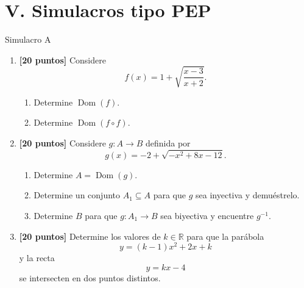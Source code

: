 \documentclass[letterpaper, 12pt]{article}
\newcommand{\R}{\mathbb{R}}
\newcommand{\Dom}{\operatorname{Dom}}
\begin{document}
\newpage
\section*{V. Simulacros tipo PEP}

\begin{pepbox}{Simulacro A}
\begin{enumerate}[label=\textbf{\arabic*.}, leftmargin=*, itemsep=1em]
    \item \textbf{[20 puntos]} Considere
    \[
        f(x)=1+\sqrt{\frac{x-3}{x+2}}.
    \]
    \begin{enumerate}[label=\textbf{\alph*)}]
        \item Determine $\Dom(f)$.
        \item Determine $\Dom(f\circ f)$.
    \end{enumerate}

    \item \textbf{[20 puntos]} Considere $g:A\to B$ definida por
    \[
        g(x)=-2+\sqrt{-x^2+8x-12}.
    \]
    \begin{enumerate}[label=\textbf{\alph*)}]
        \item Determine $A=\Dom(g)$.
        \item Determine un conjunto $A_1\subseteq A$ para que $g$ sea inyectiva y demu\'estrelo.
        \item Determine $B$ para que $g:A_1\to B$ sea biyectiva y encuentre $g^{-1}$.
    \end{enumerate}

    \item \textbf{[20 puntos]} Determine los valores de $k\in\R$ para que la par\'abola
    \[
        y=(k-1)x^2+2x+k
    \]
    y la recta
    \[
        y=kx-4
    \]
    se intersecten en dos puntos distintos.
\end{enumerate}
\end{pepbox}
\end{document}
